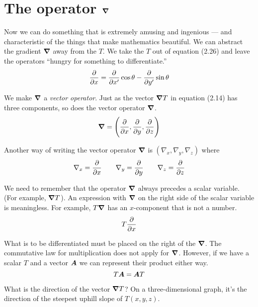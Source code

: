\section{The operator $\boldsymbol{\nabla}$}

Now we can do something that is extremely amusing and ingenious ---
and characteristic of the things that make mathematics beautiful.
We can abstract the gradient $\boldsymbol{\nabla}$ away from the $T$.
We take the $T$ out of equation (2.26) and leave the operators
``hungry for something to differentiate.''
\begin{equation}
  \frac{\partial }{\partial x} = \frac{\partial }{\partial x'} \cos \theta - \frac{\partial }{\partial y'} \sin \theta
\end{equation}

We make $\boldsymbol{\nabla}$ a \emph{vector operator}.
Just as the vector $\boldsymbol{\nabla} T$ in equation (2.14) has three components,
so does the vector operator $\boldsymbol{\nabla}$.
\begin{equation}
  \boldsymbol{\nabla} = \Bigg( \frac{\partial }{\partial x}, \frac{\partial }{\partial y}, \frac{\partial }{\partial z} \Bigg)
\end{equation}

Another way of writing the vector operator $\boldsymbol{\nabla}$ is 
$(\nabla_x,\nabla_y,\nabla_z)$ where
\begin{equation}
  \nabla_x = \frac{\partial }{\partial x} \qquad
  \nabla_y = \frac{\partial }{\partial y} \qquad
  \nabla_z = \frac{\partial }{\partial z}
\end{equation}

We need to remember that the operator $\boldsymbol{\nabla}$ always precedes a scalar variable.
(For example, $\boldsymbol{\nabla} T$). 
An expression with $\boldsymbol{\nabla}$ on the right side of the scalar variable is meaningless.
For example, $T \boldsymbol{\nabla}$ has an $x$-component that is not a number.
\begin{equation}
  T \frac{\partial }{\partial x}
\end{equation}

What is to be differentiated must be placed on the right of the $\boldsymbol{\nabla}$.
The commutative law for multiplication does not apply for $\boldsymbol{\nabla}$.
However, if we have a scalar $T$ and a vector $\boldsymbol{A}$ 
we can represent their product either way.
\begin{equation}
  T \boldsymbol{A} = \boldsymbol{A} T
\end{equation}

What is the direction of the vector $\boldsymbol{\nabla} T$?
On a three-dimensional graph,
it's the direction of the steepest uphill slope of $T(x,y,z)$.

